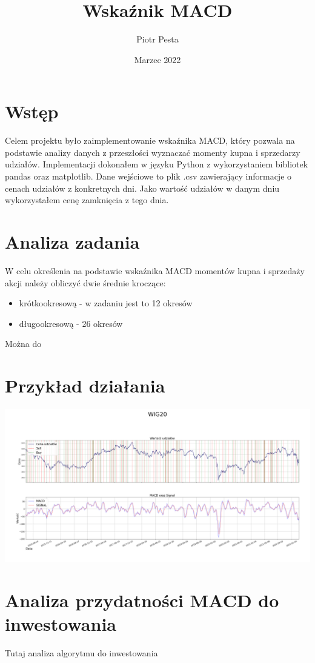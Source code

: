 \documentclass{article}
\title{Wskaźnik MACD}
\author{Piotr Pesta}
\date{Marzec 2022}
\begin{document}
\maketitle

\section{Wstęp}

    Celem projektu było zaimplementowanie wskaźnika MACD, który pozwala na podstawie analizy danych z przeszłości
    wyznaczać momenty kupna i sprzedarzy udziałów.
    Implementacji dokonałem w języku Python z wykorzystaniem bibliotek pandas oraz matplotlib.
    Dane wejściowe to plik .csv zawierający informacje o cenach udziałów z konkretnych dni. 
    Jako wartość udziałów w danym dniu wykorzystałem cenę zamknięcia z tego dnia.

\section{Analiza zadania}

    W celu określenia na podstawie wskaźnika MACD momentów kupna i sprzedaży akcji należy obliczyć
    dwie średnie kroczące:
    \begin{itemize}
        \item krótkookresową - w zadaniu jest to 12 okresów
        \item długookresową - 26 okresów
    \end{itemize}

    Można do 

\section{Przykład działania}


   \noindent\includegraphics[width=\textwidth]{WIG20}

\section{Analiza przydatności MACD do inwestowania}

    Tutaj analiza algorytmu do inwestowania
\end{document}
